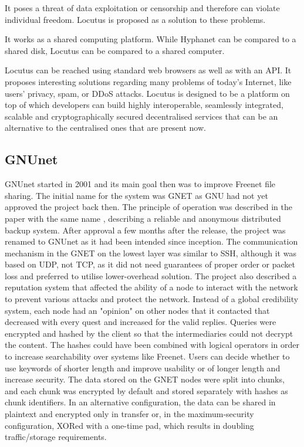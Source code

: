 It poses a threat of data exploitation or censorship and therefore can violate individual freedom. Locutus is proposed as a solution to these problems.

It works as a shared computing platform. While Hyphanet can be compared to a shared disk, Locutus can be compared to a shared computer.

Locutus can be reached using standard web browsers as well as with an API. It proposes interesting solutions regarding many problems of today’s Internet, like users' privacy, spam, or DDoS attacks. Locutus is designed to be a platform on top of which developers can build highly interoperable, seamlessly integrated, scalable and cryptographically secured decentralised services that can be an alternative to the centralised ones that are present now.

\subsection{GNUnet}
GNUnet started in 2001 and its main goal then was to improve Freenet file sharing. The initial name for the system was GNET as GNU had not yet approved the project back then. The principle of operation was described in the paper with the same name \cite{gnet}, describing a reliable and anonymous distributed backup system. After approval a few months after the release, the project was renamed to GNUnet as it had been intended since inception. The communication mechanism in the GNET on the lowest layer was similar to SSH, although it was based on UDP, not TCP, as it did not need guarantees of proper order or packet loss and preferred to utilise lower-overhead solution. The project also described a reputation system that affected the ability of a node to interact with the network to prevent various attacks and protect the network. Instead of a global credibility system, each node had an "opinion" on other nodes that it contacted that decreased with every quest and increased for the valid replies. Queries were encrypted and hashed by the client so that the intermediaries could not decrypt the content. The hashes could have been combined with logical operators in order to increase searchability over systems like Freenet. Users can decide whether to use keywords of shorter length and improve usability or of longer length and increase security. The data stored on the GNET nodes were split into chunks, and each chunk was encrypted by default and stored separately with hashes as chunk identifiers. In an alternative configuration, the data can be shared in plaintext and encrypted only in transfer or, in the maximum-security configuration, XORed with a one-time pad, which results in doubling traffic/storage requirements.

